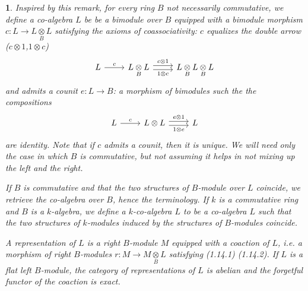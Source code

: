 \documentclass{article}
\newtheorem{env}[term]{}
\begin{document}
  \begin{env}
    Inspired by this remark, for every ring $B$ not necessarily commutative, we define a co-algebra $L$ be 
    be a bimodule over $B$ equipped with a bimodule morphism $c: L \rightarrow L \underset B \otimes L$ satisfying
    the axioms of coassociativity: $c$ equalizes the double arrow ($c \otimes 1$,$1\otimes c$)
    $$ 
    \begin{tikzcd}
      L \arrow[r,"c"]& L\underset B \otimes L \arrow[r,shift left , "c \otimes 1"]\arrow[r,shift right,"1 \otimes c"']
      & L\underset B \otimes L\underset B \otimes L
    \end{tikzcd}
    $$
    and admits a counit $e: L \rightarrow B$: a morphism of bimodules such the the compositions
    $$ 
    \begin{tikzcd}
      L \arrow[r,"c"] & L \otimes L \arrow[r,shift left,"e \otimes 1"]\arrow[r,shift right,"1 \otimes e"'] & L
    \end{tikzcd}
    $$
    are identity. Note that if $c$ admits a counit, then it is unique. We will need only the case in which 
    $B$ is commutative, but not assuming it helps in not mixing up the left and the right.

    If $B$ is commutative and that the two structures of $B$-module over $L$ coincide, we retrieve the 
    co-algebra over $B$, hence the terminology. If $k$ is a commutative ring and $B$ is a $k$-algebra, we define a
    $k$-co-algebra $L$ to be a co-algebra $L$ such that the two structures of $k$-modules induced by the 
    structures of $B$-modules coincide.

    A representation of $L$ is a right $B$-module $M$ equipped with a coaction of $L$, i.e. a morphism of right 
    $B$-modules $r:M \rightarrow M \underset B \otimes L$ satisfying (1.14.1) (1.14.2). If $L$ is a flat left 
    $B$-module, the category of representations of $L$ is abelian and the forgetful functor of the coaction is exact.
  \end{env}
\end{document}

